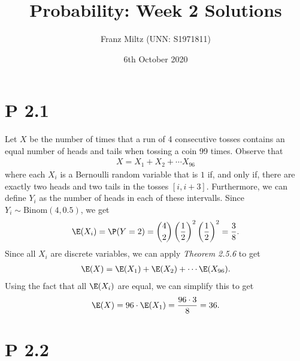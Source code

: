 \documentclass{article}
\begin{document}
\title{Probability: Week 2 Solutions}
\author{Franz Miltz (UNN: S1971811)}
\date{6th October 2020}
\maketitle


\section*{P 2.1}


Let $X$ be the number of times that a run of 4 consecutive tosses
contains an equal number of heads and tails when tossing a coin 99 times.
Observe that
\begin{align*}
  X=X_1 + X_2 + \cdots X_{96}
\end{align*}
where each $X_i$ is a Bernoulli random variable that is $1$ if,
and only if, there are exactly two heads and two tails in the tosses
$[i, i+3]$. Furthermore, we can define $Y_i$ as the number of heads
in each of these intervalls. Since $Y_i\sim \text{Binom}(4,0.5)$,
we get
\begin{align*}
  \E(X_i) = \P(Y=2) = \binom{4}{2}\left(\frac{1}{2}\right)^2\left(\frac{1}{2}\right)^2=\frac{3}{8}.
\end{align*}
Since all $X_i$ are discrete variables, we can apply \emph{Theorem 2.5.6}
to get
\begin{align*}
  \E(X) = \E(X_1) + \E(X_2) + \cdots \E(X_{96}).
\end{align*}
Using the fact that all $\E(X_i)$ are equal, we can simplify this to get
\begin{align*}
  \E(X) = 96\cdot\E(X_1) = \frac{96\cdot3}{8}=36.
\end{align*}


\section*{P 2.2}
\end{document}
